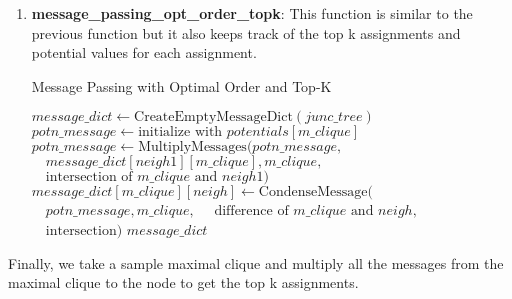 \documentclass[12pt]{article}
\begin{document}
\begin{enumerate}
    \item \textbf{message\_passing\_opt\_order\_topk}: This function is similar to the previous function but it also keeps track of the top k assignments and potential values for each assignment.
    
    \begin{algorithm}
        \caption{Message Passing with Optimal Order and Top-K}
        \begin{algorithmic}[1]
            \State $message\_dict \gets \text{CreateEmptyMessageDict}(junc\_tree)$
                \State $potn\_message \gets \text{initialize with } potentials[m\_clique]$
                        \State $potn\_message \gets \text{MultiplyMessages}(potn\_message,$
                        \State $\quad message\_dict[neigh1][m\_clique], m\_clique,$
                        \State $\quad \text{intersection of } m\_clique \text{ and } neigh1)$
                    \EndIf
                \EndFor
                \State $message\_dict[m\_clique][neigh] \gets \text{CondenseMessage}($
                \State $\quad potn\_message, m\_clique,$
                \State $\quad \text{difference of } m\_clique \text{ and } neigh,$
                \State $\quad \text{intersection})$
            \EndFor
            \State \Return $message\_dict$
        \EndFunction
        \end{algorithmic}
    \end{algorithm}

\end{enumerate}

Finally, we take a sample maximal clique and multiply all the messages from the maximal clique to the node to get the top k assignments.
\end{document}

